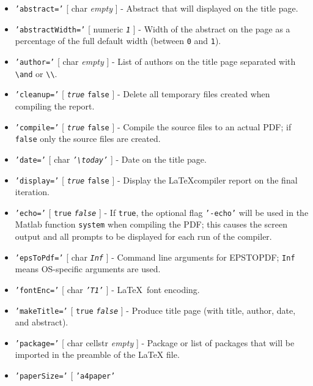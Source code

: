 \begin{itemize}
\item
  \texttt{'abstract='} {[} char \textbar{} \emph{empty} {]} - Abstract
  that will displayed on the title page.
\item
  \texttt{'abstractWidth='} {[} numeric \textbar{} \emph{\texttt{1}} {]}
  - Width of the abstract on the page as a percentage of the full
  default width (between \texttt{0} and \texttt{1}).
\item
  \texttt{'author='} {[} char \textbar{} \emph{empty} {]} - List of
  authors on the title page separated with \texttt{\textbackslash{}and}
  or \texttt{\textbackslash{}\textbackslash{}}.
\item
  \texttt{'cleanup='} {[} \emph{\texttt{true}} \textbar{} \texttt{false}
  {]} - Delete all temporary files created when compiling the report.
\item
  \texttt{'compile='} {[} \emph{\texttt{true}} \textbar{} \texttt{false}
  {]} - Compile the source files to an actual PDF; if \texttt{false}
  only the source files are created.
\item
  \texttt{'date='} {[} char \textbar{}
  \emph{\texttt{'\textbackslash{}today'}} {]} - Date on the title page.
\item
  \texttt{'display='} {[} \emph{\texttt{true}} \textbar{} \texttt{false}
  {]} - Display the \LaTeX compiler report on the final iteration.
\item
  \texttt{'echo='} {[} \texttt{true} \textbar{} \emph{\texttt{false}}
  {]} - If \texttt{true}, the optional flag \texttt{'-echo'} will be
  used in the Matlab function \texttt{system} when compiling the PDF;
  this causes the screen output and all prompts to be displayed for each
  run of the compiler.
\item
  \texttt{'epsToPdf='} {[} char \textbar{} \emph{\texttt{Inf}} {]} -
  Command line arguments for EPSTOPDF; \texttt{Inf} means OS-specific
  arguments are used.
\item
  \texttt{'fontEnc='} {[} char \textbar{} \emph{\texttt{'T1'}} {]} -
  \LaTeX~font encoding.
\item
  \texttt{'makeTitle='} {[} \texttt{true} \textbar{}
  \emph{\texttt{false}} {]} - Produce title page (with title, author,
  date, and abstract).
\item
  \texttt{'package='} {[} char \textbar{} cellstr \textbar{}
  \emph{empty} {]} - Package or list of packages that will be imported
  in the preamble of the LaTeX file.
\item
  \texttt{'paperSize='} {[} \texttt{'a4paper'} \textbar{}

\end{itemize}
